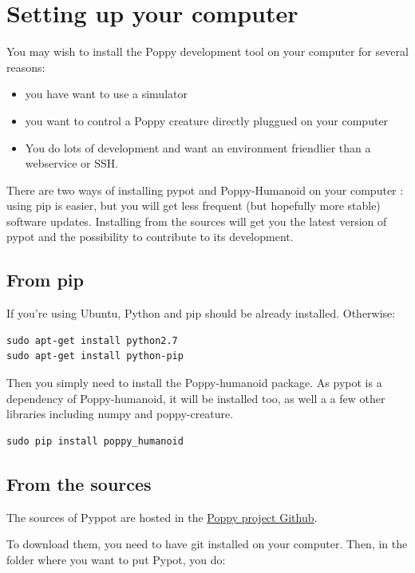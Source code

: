 \documentclass{article}
\begin{document}
\section{Setting up your computer}
\label{installing-pypot}
You may wish to install the Poppy development tool on your computer for several reasons:

\begin{itemize}
\item you have want to use a simulator
\item you want to control a Poppy creature directly pluggued on your computer
\item You do lots of development and want an environment friendlier than a webservice or SSH.
\end{itemize}


There are two ways of installing pypot and Poppy-Humanoid on your computer : using pip is easier, but you will get less frequent (but hopefully more stable) software updates. Installing from the sources will get you the latest version of pypot and the possibility to contribute to its development.

\subsection{From pip}
If you're using Ubuntu, Python and pip should be already installed. Otherwise:
\begin{verbatim}
sudo apt-get install python2.7
sudo apt-get install python-pip
\end{verbatim}

Then you simply need to install the Poppy-humanoid package. As pypot is a dependency of Poppy-humanoid, it will be installed too, as well a a few other libraries including numpy and poppy-creature.

\begin{verbatim}
sudo pip install poppy_humanoid
\end{verbatim}

\subsection{From the sources}

The sources of Pyppot are hosted in the \href{https://github.com/poppy-project/pypot}{Poppy project Github}.

To download them, you need to have git installed on your computer. Then, in the folder where you want to put Pypot, you do:
\end{document}
